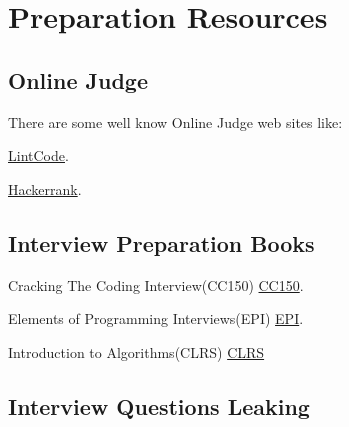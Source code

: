 \chapter{Preparation Resources}




\section{Online Judge }

There are some well know Online Judge web sites like:

 
\href{http://www.lintcode.com/en/problem/}{LintCode}. 

\href{http://www.hackerrank.com/}{Hackerrank}. 

\section{Interview Preparation Books }

Cracking The Coding Interview(CC150)
\href{http://www.amazon.com/Cracking-Coding-Interview-Programming-Questions/dp/098478280X}{CC150}. 

Elements of Programming Interviews(EPI)
\href{http://www.amazon.com/Elements-Programming-Interviews-Insiders-Guide/dp/1479274836}{EPI}.

Introduction to Algorithms(CLRS)
\href{http://mitpress.mit.edu/books/introduction-algorithms}{CLRS}



\section{Interview Questions Leaking }
 